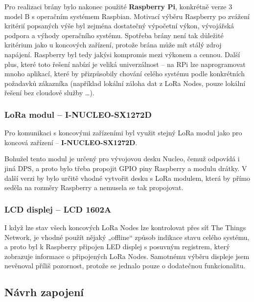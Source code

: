         Pro realizaci brány bylo nakonec použité \textbf{Raspberry Pi}, konkrétně verze 3 model B s operačním systémem Raspbian. 
        Motivací výběru Raspberry po zvážení kritérií popsaných výše byl zejména dostatečný výpočetní výkon, vývojářská podpora a výhody operačního systému. Spotřeba brány není tak důležité kritérium jako u koncových zařízení, protože brána může mít stálý zdroj napájení. Raspberry byl tedy jakýsi kompromis mezi výkonem a cennou. Další plus, které toto řešení nabízí je veliká univerzálnost – na RPi lze naprogramovat mnoho aplikací, které by přizpůsobily chování celého systému podle konkrétních požadavků zákazníka (například lokální záloha dat z LoRa Nodes, pouze lokální řešení bez cloudové služby \ldots).
        
        
        
    \subsubsection{LoRa modul – I-NUCLEO-SX1272D}

        Pro komunikaci s koncovými zařízeními byl využit stejný LoRa modul jako pro koncová zařízení – \textbf{I-NUCLEO-SX1272D}.

        Bohužel tento modul je určený pro vývojovou desku Nucleo, čemuž odpovídá i jiná DPS, a proto bylo třeba propojit GPIO piny Raspberry a modulu drátky. V další verzi by bylo určitě vhodné vytvořit desku s LoRa modulem, která by přímo seděla na rozměry Raspberry a nemusela se tak propojovat.
        
    \subsubsection{LCD displej – LCD 1602A}
        I když lze stav všech koncových LoRa Nodes lze kontrolovat přes síť The Things Network, je vhodné použít nějaký „offline“ způsob indikace stavu celého systému, a proto byl k Raspberry připojen LED displej s posuvným registrem, který zobrazuje informace o připojených LoRa Nodes. Samotnému výběru displeje jsem nevěnoval příliš pozornost, protože se jednalo pouze o dodatečnou funkcionalitu.
        
\subsection{Návrh zapojení}


